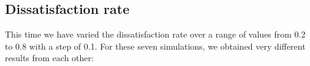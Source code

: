 \documentclass[a4paper, 12pt]{report}
\begin{document}
\subsection{Dissatisfaction rate}

This time we have varied the dissatisfaction rate over a range of values from 0.2 to 0.8 with a step of 0.1. For these seven simulations, we obtained
very different results from each other:

\begin{figure}[!h]
	\centering
\end{figure}
\end{document}
